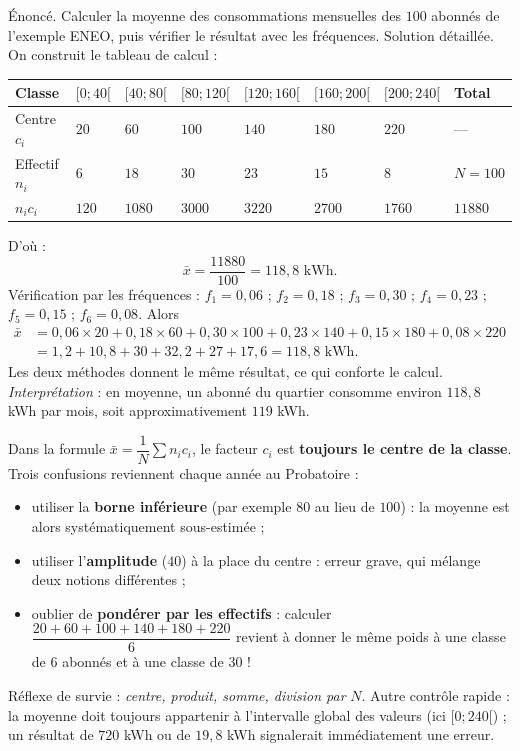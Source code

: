 \documentclass[11pt]{article}
\begin{document}
\begin{exoresolu}
Énoncé. Calculer la moyenne des consommations mensuelles des $100$ abonnés de l'exemple ENEO, puis vérifier le résultat avec les fréquences.
\tcblower
Solution détaillée. On construit le tableau de calcul :
\begin{center}
\begin{tabularx}{\linewidth}{|l|X|X|X|X|X|X|X|}
\hline
\rowcolor{popblueL} Classe & $[0;40[$ & $[40;80[$ & $[80;120[$ & $[120;160[$ & $[160;200[$ & $[200;240[$ & Total \\
\hline
Centre $c_i$ & $20$ & $60$ & $100$ & $140$ & $180$ & $220$ & --- \\
\hline
Effectif $n_i$ & $6$ & $18$ & $30$ & $23$ & $15$ & $8$ & $N = 100$ \\
\hline
$n_i c_i$ & $120$ & $1080$ & $3000$ & $3220$ & $2700$ & $1760$ & $11880$ \\
\hline
\end{tabularx}
\end{center}
D'où :
\[ \bar{x} = \frac{11880}{100} = 118{,}8 \text{ kWh}. \]
Vérification par les fréquences : $f_1 = 0{,}06$ ; $f_2 = 0{,}18$ ; $f_3 = 0{,}30$ ; $f_4 = 0{,}23$ ; $f_5 = 0{,}15$ ; $f_6 = 0{,}08$. Alors
\begin{align*}
\bar{x} &= 0{,}06 \times 20 + 0{,}18 \times 60 + 0{,}30 \times 100 + 0{,}23 \times 140 + 0{,}15 \times 180 + 0{,}08 \times 220 \\
&= 1{,}2 + 10{,}8 + 30 + 32{,}2 + 27 + 17{,}6 = 118{,}8 \text{ kWh}.
\end{align*}
Les deux méthodes donnent le même résultat, ce qui conforte le calcul.
\emph{Interprétation} : en moyenne, un abonné du quartier consomme environ $118{,}8$ kWh par mois, soit approximativement $119$ kWh.
\end{exoresolu}

\begin{attention}
Dans la formule $\bar{x} = \dfrac{1}{N}\sum n_i c_i$, le facteur $c_i$ est \textbf{toujours le centre de la classe}. Trois confusions reviennent chaque année au Probatoire :
\begin{itemize}
\item utiliser la \textbf{borne inférieure} (par exemple $80$ au lieu de $100$) : la moyenne est alors systématiquement sous-estimée ;
\item utiliser l'\textbf{amplitude} ($40$) à la place du centre : erreur grave, qui mélange deux notions différentes ;
\item oublier de \textbf{pondérer par les effectifs} : calculer $\dfrac{20+60+100+140+180+220}{6}$ revient à donner le même poids à une classe de $6$ abonnés et à une classe de $30$ !
\end{itemize}
Réflexe de survie : \emph{centre, produit, somme, division par} $N$. Autre contrôle rapide : la moyenne doit toujours appartenir à l'intervalle global des valeurs (ici $[0;240[$) ; un résultat de $720$ kWh ou de $19{,}8$ kWh signalerait immédiatement une erreur.
\end{attention}
\end{document}
